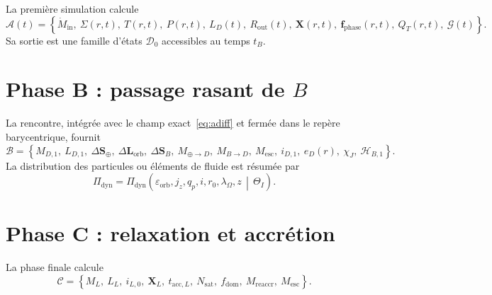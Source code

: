 \documentclass[11pt,a4paper,openany]{report}
\begin{document}
La première simulation calcule
\begin{equation}
\mathcal{A}(t)=\left\{\dot M_{\mathrm{in}},\ \Sigma(r,t),\ T(r,t),\ P(r,t),\ L_D(t),\
R_{\mathrm{out}}(t),\ \mathbf{X}(r,t),\ \mathbf{f}_{\mathrm{phase}}(r,t),\ Q_T(r,t),\ \mathcal{G}(t)\right\}.
\label{eq:phaseA}
\end{equation}
Sa sortie est une famille d'états $\mathcal{D}_0$ accessibles au temps $t_B$.

\section{Phase B : passage rasant de \texorpdfstring{$B$}{B}}

La rencontre, intégrée avec le champ exact~\eqref{eq:adiff} et fermée dans le repère
barycentrique, fournit
\begin{equation}
\mathcal{B}=\left\{M_{D,1},\ L_{D,1},\ \Delta\mathbf{S}_\oplus,\ \Delta\mathbf{L}_{\mathrm{orb}},\
\Delta\mathbf{S}_B,\ M_{\oplus\to D},\ M_{B\to D},\ M_{\mathrm{esc}},\ i_{D,1},\ e_D(r),\ \chi_J,\ \mathcal{H}_{B,1}\right\}.
\label{eq:phaseB}
\end{equation}
La distribution des particules ou éléments de fluide est résumée par
\begin{equation}
\Pi_{\mathrm{dyn}}=\Pi_{\mathrm{dyn}}\left(\varepsilon_{\mathrm{orb}},j_z,q_p,i,r_0,\lambda_\Omega,z
\,\middle|\,\Theta_I\right).
\label{eq:Pidyn}
\end{equation}

\section{Phase C : relaxation et accrétion}

La phase finale calcule
\begin{equation}
\mathcal{C}=\left\{M_L,\ L_L,\ i_{L,0},\ \mathbf{X}_L,\ t_{\mathrm{acc},L},\ N_{\mathrm{sat}},\
f_{\mathrm{dom}},\ M_{\mathrm{reaccr}},\ M_{\mathrm{esc}}\right\}.
\label{eq:phaseC}
\end{equation}
\end{document}
